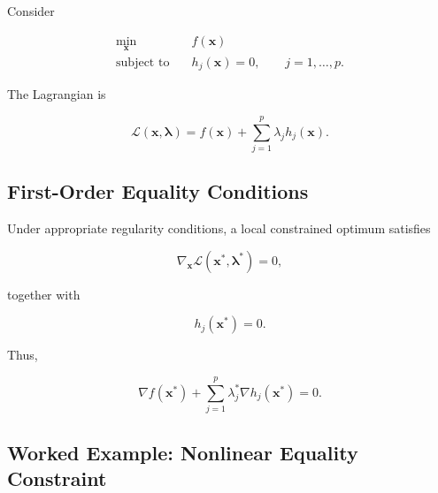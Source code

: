 Consider

\[
\boxed{
\begin{aligned}
\min_{\mathbf{x}}
\quad&
f(\mathbf{x})
\\
\text{subject to}
\quad&
h_j(\mathbf{x})=0,
\qquad
j=1,\ldots,p.
\end{aligned}
}
\]

The Lagrangian is

\[
\boxed{
\mathcal{L}
(
\mathbf{x},
\boldsymbol{\lambda}
)
=
f(\mathbf{x})
+
\sum_{j=1}^{p}
\lambda_j
h_j(\mathbf{x}).
}
\]

\subsection{First-Order Equality Conditions}
\label{subsec:nlp-first-order-equality}

Under appropriate regularity conditions, a local constrained optimum
satisfies

\[
\boxed{
\nabla_{\mathbf{x}}
\mathcal{L}
(
\mathbf{x}^*,
\boldsymbol{\lambda}^*
)
=
0,
}
\]

together with

\[
\boxed{
h_j(\mathbf{x}^*)=0.
}
\]

Thus,

\[
\boxed{
\nabla f(\mathbf{x}^*)
+
\sum_{j=1}^{p}
\lambda_j^*
\nabla h_j(\mathbf{x}^*)
=
0.
}
\]

\subsection{Worked Example: Nonlinear Equality Constraint}
\label{subsec:worked-nlp-equality}

